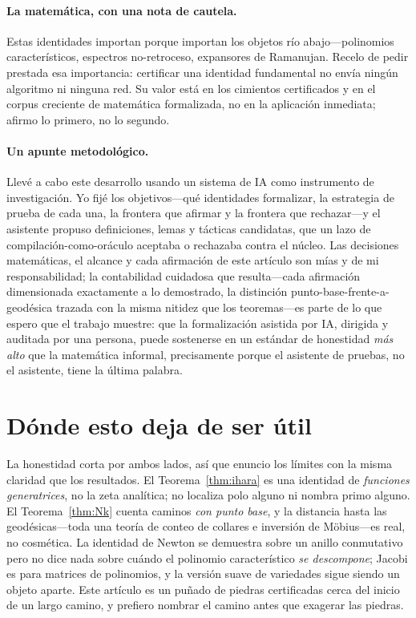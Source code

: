 \documentclass[11pt]{article}
\begin{document}
\paragraph{La matem\'atica, con una nota de cautela.}
Estas identidades importan porque importan los objetos r\'io abajo---polinomios caracter\'isticos,
espectros no-retroceso, expansores de Ramanujan. Recelo de pedir prestada esa importancia: certificar
una identidad fundamental no env\'ia ning\'un algoritmo ni ninguna red. Su valor est\'a en los
cimientos certificados y en el corpus creciente de matem\'atica formalizada, no en la aplicaci\'on
inmediata; afirmo lo primero, no lo segundo.

\paragraph{Un apunte metodol\'ogico.}
Llev\'e a cabo este desarrollo usando un sistema de IA como instrumento de investigaci\'on. Yo fij\'e
los objetivos---qu\'e identidades formalizar, la estrategia de prueba de cada una, la frontera que
afirmar y la frontera que rechazar---y el asistente propuso definiciones, lemas y t\'acticas
candidatas, que un lazo de compilaci\'on-como-or\'aculo aceptaba o rechazaba contra el n\'ucleo. Las
decisiones matem\'aticas, el alcance y cada afirmaci\'on de este art\'iculo son m\'ias y de mi
responsabilidad; la contabilidad cuidadosa que resulta---cada afirmaci\'on dimensionada exactamente a
lo demostrado, la distinci\'on punto-base-frente-a-geod\'esica trazada con la misma nitidez que los
teoremas---es parte de lo que espero que el trabajo muestre: que la formalizaci\'on asistida por IA,
dirigida y auditada por una persona, puede sostenerse en un est\'andar de honestidad \emph{m\'as alto}
que la matem\'atica informal, precisamente porque el asistente de pruebas, no el asistente, tiene la
\'ultima palabra.

\section{D\'onde esto deja de ser \'util}
\label{sec:context}

La honestidad corta por ambos lados, as\'i que enuncio los l\'imites con la misma claridad que los
resultados. El Teorema~\ref{thm:ihara} es una identidad de \emph{funciones generatrices}, no la zeta
anal\'itica; no localiza polo alguno ni nombra primo alguno. El Teorema~\ref{thm:Nk} cuenta caminos
\emph{con punto base}, y la distancia hasta las geod\'esicas---toda una teor\'ia de conteo de collares
e inversi\'on de M\"obius---es real, no cosm\'etica. La identidad de Newton se demuestra sobre un
anillo conmutativo pero no dice nada sobre cu\'ando el polinomio caracter\'istico \emph{se
descompone}; Jacobi es para matrices de polinomios, y la versi\'on suave de variedades sigue siendo un
objeto aparte. Este art\'iculo es un pu\~nado de piedras certificadas cerca del inicio de un largo
camino, y prefiero nombrar el camino antes que exagerar las piedras.
\end{document}

